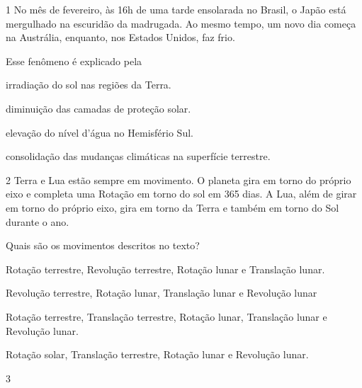 
\num{1} No mês de fevereiro, às 16h de uma tarde ensolarada no
Brasil, o Japão está mergulhado na escuridão da madrugada. Ao mesmo
tempo, um novo dia começa na Austrália, enquanto, nos
Estados Unidos, faz frio.

Esse fenômeno é explicado pela

\begin{escolha}
\item irradiação do sol nas regiões da Terra.

\item diminuição das camadas de proteção solar.

\item elevação do nível d'água no Hemisfério Sul.

\item consolidação das mudanças climáticas na superfície terrestre.
\end{escolha}


\num{2} Terra e Lua estão sempre em movimento. O planeta gira em
torno do próprio eixo e completa uma Rotação em torno do sol em 365
dias. A Lua, além de girar em torno do próprio eixo, gira em torno da
Terra e também em torno do Sol durante o ano.

Quais são os movimentos descritos no texto?

\begin{escolha}
\item Rotação terrestre, Revolução terrestre, Rotação lunar e Translação lunar.

\item Revolução terrestre, Rotação lunar, Translação lunar e Revolução lunar

\item Rotação terrestre, Translação terrestre, Rotação lunar, Translação lunar e Revolução lunar.

\item Rotação solar, Translação terrestre, Rotação lunar e Revolução lunar.
\end{escolha}


\num{3}

